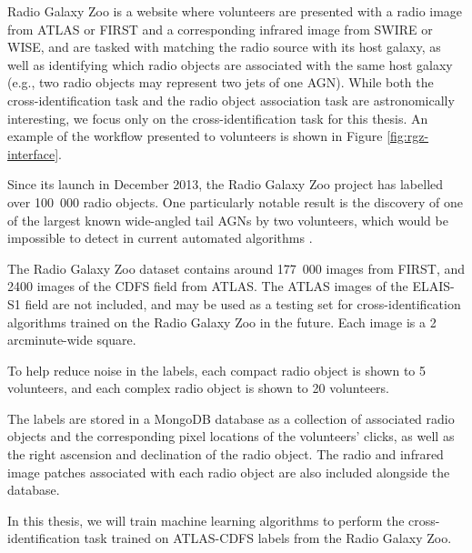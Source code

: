     Radio Galaxy Zoo is a website where volunteers are presented with a radio
    image from ATLAS or FIRST and a corresponding infrared image from SWIRE or
    WISE, and are tasked with matching the radio source with its host galaxy, as
    well as identifying which radio objects are associated with the same host
    galaxy (e.g., two radio objects may represent two jets of one AGN). While
    both the cross-identification task and the radio object association task are
    astronomically interesting, we focus only on the cross-identification task
    for this thesis. An example of the workflow presented to volunteers is shown
    in Figure \ref{fig:rgz-interface}.

    Since its launch in December 2013, the Radio Galaxy Zoo project has labelled
    over 100~000 radio objects. One particularly notable result is the discovery
    of one of the largest known wide-angled tail AGNs by two volunteers, which
    would be impossible to detect in current automated algorithms
    \citep{banfield16}.

    The Radio Galaxy Zoo dataset contains around 177~000 images from FIRST, and
    2400 images of the CDFS field from ATLAS. The ATLAS images of the ELAIS-S1
    field are not included, and may be used as a testing set for
    cross-identification algorithms trained on the Radio Galaxy Zoo in the
    future. Each image is a 2 arcminute-wide square.

    To help reduce noise in the labels, each compact radio object is shown to 5
    volunteers, and each complex radio object is shown to 20 volunteers.

    The labels are stored in a MongoDB database as a collection of associated
    radio objects and the corresponding pixel locations of the volunteers'
    clicks, as well as the right ascension and declination of the radio object.
    The radio and infrared image patches associated with each radio object are
    also included alongside the database.

    In this thesis, we will train machine learning algorithms to perform the
    cross-identification task trained on ATLAS-CDFS labels from the Radio Galaxy
    Zoo.



